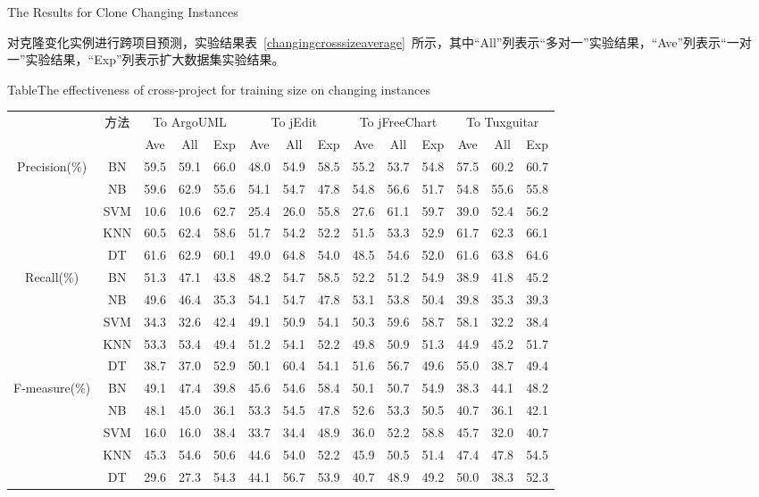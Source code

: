 {The Results for Clone Changing Instances}

对克隆变化实例进行跨项目预测，实验结果表~\ref{changingcrosssizeaverage}~所示，其中“All”列表示“多对一”实验结果，“Ave”列表示“一对一”实验结果，“Exp”列表示扩大数据集实验结果。

\begin{table} [h]
{Table$\!$}{The effectiveness of cross-project for training size on changing instances}
\vspace{0.5em}
\centering
\footnotesize
\begin{tabular}{cccccccccccccc}
\toprule[1.5pt]
~\multirow{2}{*}{指标}&\multirow{2}{*}{方法}&\multicolumn{3}{c}{To ArgoUML}&\multicolumn{3}{c}{To jEdit}&\multicolumn{3}{c}{To jFreeChart}&\multicolumn{3}{c}{To  Tuxguitar}\\
\cline{3-14}
~&~&{Ave}&{All}&{Exp}&{Ave}&{All}&{Exp}&{Ave}&{All}&{Exp}&{Ave}&{All}&{Exp}\\
\midrule[1pt]
\multirow{5}{*}{Precision(\%)}
&BN&59.5&59.1&66.0&48.0&54.9&58.5&55.2&53.7&54.8&57.5&60.2&60.7\\
&NB&59.6&62.9&55.6&54.1&54.7&47.8&54.8&56.6&51.7&54.8&55.6&55.8\\
&SVM&10.6&10.6&62.7&25.4&26.0&55.8&	27.6&61.1&59.7&	39.0&52.4&56.2\\
&KNN&60.5&62.4&58.6&51.7&54.2&52.2&51.5&53.3&52.9&61.7&62.3&66.1\\
&DT	&61.6&	62.9&60.1&49.0&64.8&54.0&48.5&54.6&52.0&61.6&63.8&64.6\\
\hline
\multirow{5}{*}{Recall(\%)}								
&BN&51.3&47.1&43.8&48.2&54.7&58.5&52.2&51.2&54.9&38.9&41.8&45.2\\
&NB&49.6&46.4&35.3&54.1&54.7&47.8&53.1&53.8&50.4&39.8&35.3&39.3\\
&SVM&34.3&32.6&42.4&49.1&50.9&54.1&50.3&59.6&58.7&58.1&32.2&38.4\\
&KNN&53.3&53.4&49.4&51.2&54.1&52.2&49.8&50.9&51.3&44.9&45.2&51.7\\
&DT	&38.7&37.0&52.9&50.1&60.4&54.1&51.6&	56.7&49.6&	55.0&	38.7&49.4\\
\hline
\multirow{5}{*}{F-measure(\%)}								
&BN&	49.1&47.4&39.8&	45.6&	54.6&58.4&50.1&50.7&54.9&38.3&44.1&48.2\\
&NB&	48.1&	45.0&36.1&53.3&54.5&47.8&52.6&53.3&50.5&40.7&36.1&42.1\\
&SVM&	16.0&16.0&38.4&33.7&34.4&48.9&36.0&52.2&58.8&45.7&32.0&40.7\\
&KNN&	45.3&	54.6&50.6&44.6&54.0&52.2&45.9&50.5&51.4&47.4&47.8&54.5\\
&DT&	29.6&27.3&54.3&44.1&56.7&53.9&40.7&48.9&49.2&50.0&38.3&52.3\\
\bottomrule[1.5pt]
\end{tabular}
\end{table}

